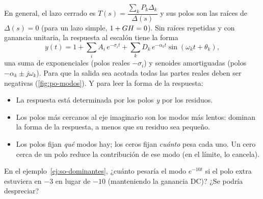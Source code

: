 En general, el lazo cerrado es $T(s)=\dfrac{\sum_kP_k\Delta_k}{\Delta(s)}$ y sus polos son las raíces de $\Delta(s)=0$ (para un lazo simple, $1+GH=0$). Sin raíces repetidas y con ganancia unitaria, la respuesta al escalón tiene la forma
\[
  y(t)=1+\sum_{i}A_i\,e^{-\sigma_it}+\sum_kD_k\,e^{-\alpha_kt}\sin(\omega_kt+\theta_k),
\]
una suma de exponenciales (polos reales $-\sigma_i$) y senoides amortiguadas (polos $-\alpha_k\pm j\omega_k$). Para que la salida sea acotada todas las partes reales deben ser negativas (\cref{fig:po-modos}). Y para leer la forma de la respuesta:
\begin{itemize}
  \item La respuesta está determinada por los polos \emph{y} por los residuos.
  \item Los polos más cercanos al eje imaginario son los modos más lentos: dominan la forma de la respuesta, a menos que su residuo sea pequeño.
  \item Los polos fijan \emph{qué} modos hay; los ceros fijan \emph{cuánto} pesa cada uno. Un cero cerca de un polo reduce la contribución de ese modo (en el límite, lo cancela).
\end{itemize}

\begin{pausa}
En el ejemplo~\ref{ej:so-dominantes}, ¿cuánto pesaría el modo $e^{-10t}$ si el polo extra estuviera en $-3$ en lugar de $-10$ (manteniendo la ganancia DC)? ¿Se podría despreciar?
\end{pausa}
